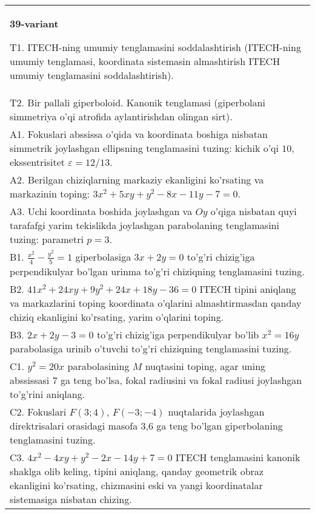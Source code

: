 \documentclass{article}
\begin{document}
\begin{tabular}{m{17cm}}
\textbf{39-variant}
\newline

T1. ITECH-ning umumiy tenglamasini soddalashtirish (ITECH-ning umumiy tenglamasi, koordinata sistemasin almashtirish ITECH umumiy tenglamasini soddalashtirish).\\

T2. Bir pallali giperboloid. Kanonik tenglamasi (giperbolani simmetriya o'qi atrofida aylantirishdan olingan sirt).\\

A1. Fokuslari abssissa o'qida va koordinata boshiga nisbatan simmetrik joylashgan ellipsning tenglamasini tuzing: kichik o'qi $10$, ekssentrisitet $\varepsilon=12/13$.\\

A2. Berilgan chiziqlarning markaziy ekanligini ko'rsating va markazinin toping: $3x^{2}+5xy+y^{2}-8x-11y-7=0$.\\

A3. Uchi koordinata boshida joylashgan va $Oy$ o'qiga nisbatan quyi tarafafgi yarim tekislikda joylashgan parabolaning tenglamasini tuzing: parametri $p=3$.\\

B1. $\frac{x^{2}}{4} - \frac{y^{2}}{5} = 1$ giperbolasiga $3x + 2y = 0$ to'g'ri chizig'iga perpendikulyar bo'lgan urinma to'g'ri chiziqning tenglamasini tuzing.\\

B2. $41x^{2} + 24xy + 9y^{2} + 24x + 18y - 36 = 0$ ITECH tipini aniqlang va markazlarini toping koordinata o'qlarini almashtirmasdan qanday chiziq ekanligini ko'rsating, yarim o'qlarini toping.  \\

B3. $2x + 2y - 3 = 0$ to'g'ri chizig'iga perpendikulyar bo'lib $x^{2} = 16y$ parabolasiga urinib o'tuvchi to'g'ri chiziqning tenglamasini tuzing.  \\

C1. $y^{2} = 20x$ parabolasining $M$ nuqtasini toping, agar uning abssissasi 7 ga teng bo'lsa, fokal radiusini va fokal radiusi joylashgan to'g'rini aniqlang.\\

C2. Fokuslari $F(3;4)$, $F(-3;-4)$ nuqtalarida joylashgan direktrisalari orasidagi masofa 3,6 ga teng bo'lgan giperbolaning tenglamasini tuzing.  \\

C3. $4x^{2} - 4xy + y^{2} - 2x - 14y + 7 = 0$ ITECH tenglamasini kanonik shaklga olib keling, tipini aniqlang, qanday geometrik obraz ekanligini ko'rsating, chizmasini eski va yangi koordinatalar sistemasiga nisbatan chizing.  \\

\end{tabular}
\vspace{1cm}
\end{document}
